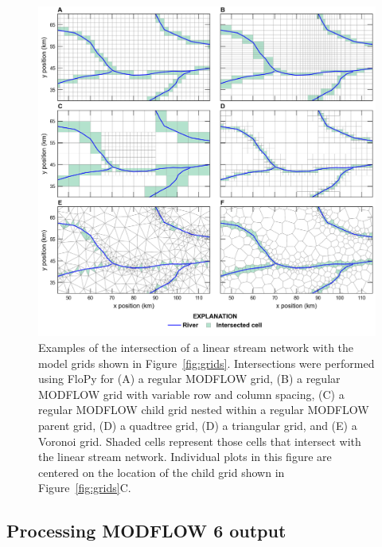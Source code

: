 \documentclass[11pt, oneside]{article}  	%
\begin{document}
\begin{figure}[ht!]
	\begin{center}
		\includegraphics{figures/grids_intersection.png}
	\end{center}
	\caption{Examples of the intersection of a linear stream network with the model grids shown in Figure~\ref{fig:grids}. Intersections were performed using FloPy for (A) a regular MODFLOW grid, (B) a regular MODFLOW grid with variable row and column spacing, (C) a regular MODFLOW child grid nested within a regular MODFLOW parent grid, (D) a quadtree grid, (D) a triangular grid, and (E) a Voronoi grid. Shaded cells represent those cells that intersect with the linear stream network. Individual plots in this figure are centered on the location of the child grid shown in Figure~\ref{fig:grids}C.}
	\label{fig:intersections}
\end{figure}


\subsection{Processing MODFLOW 6 output}
\end{document}
